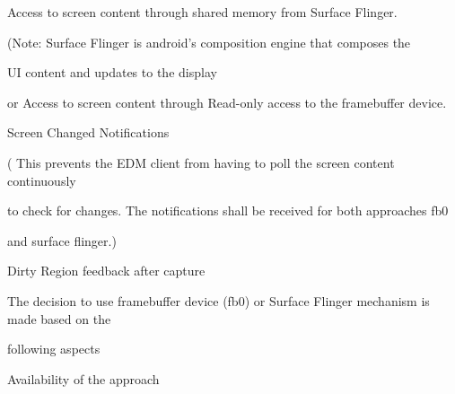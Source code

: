 \begin{DoxyItemize}
\item \-Access to screen content through shared memory from \-Surface \-Flinger. \par

\end{DoxyItemize}

(\-Note\-: \-Surface \-Flinger is android's composition engine that composes the

\-U\-I content and updates to the display\par



\begin{DoxyItemize}
\item or \-Access to screen content through \-Read-\/only access to the framebuffer device.\par

\end{DoxyItemize}


\begin{DoxyItemize}
\item \-Screen \-Changed \-Notifications\par

\end{DoxyItemize}

( \-This prevents the \-E\-D\-M client from having to poll the screen content continuously

to check for changes. \-The notifications shall be received for both approaches fb0

and surface flinger.)\par



\begin{DoxyItemize}
\item \-Dirty \-Region feedback after capture\par

\end{DoxyItemize}

\-The decision to use framebuffer device (fb0) or \-Surface \-Flinger mechanism is made based on the

following aspects\par



\begin{DoxyItemize}
\item \-Availability of the approach \par

\end{DoxyItemize}


